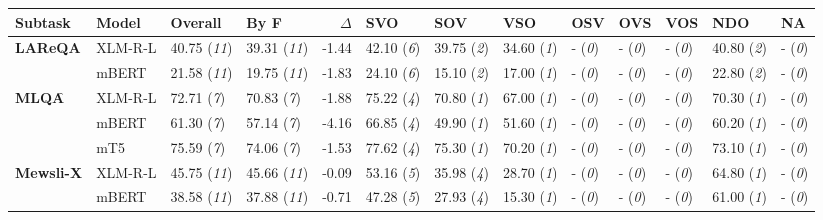 \begin{tabular}{ll||llr|llllllll}
	\toprule
	    Subtask                                    & Model & \textbf{Overall} & \textbf{By F} & $\Delta$ & SVO & SOV & VSO & OSV & OVS & VOS & NDO & NA \\\midrule\midrule
	\multirow{2}{*}{\textbf{LAReQA}\map} & XLM-R-L & 40.75 (\textit{11}) & 39.31 (\textit{11}) & -1.44 & \cellcolor{high-color!40}  42.10 (\textit{6}) &  39.75 (\textit{2}) & \cellcolor{low-color!40}  34.60 (\textit{1}) & - (\textit{0}) & - (\textit{0}) & - (\textit{0}) &  40.80 (\textit{2}) & - (\textit{0}) \\
	 & mBERT & 21.58 (\textit{11}) & 19.75 (\textit{11}) & -1.83 & \cellcolor{high-color!40}  24.10 (\textit{6}) &  15.10 (\textit{2}) & \cellcolor{low-color!40}  17.00 (\textit{1}) & - (\textit{0}) & - (\textit{0}) & - (\textit{0}) &  22.80 (\textit{2}) & - (\textit{0}) \\\midrule
	\multirow{3}{*}{\textbf{MLQA}\f} & XLM-R-L & 72.71 (\textit{7}) & 70.83 (\textit{7}) & -1.88 & \cellcolor{high-color!40}  75.22 (\textit{4}) & \cellcolor{low-color!40}  70.80 (\textit{1}) & \cellcolor{low-color!40}  67.00 (\textit{1}) & - (\textit{0}) & - (\textit{0}) & - (\textit{0}) & \cellcolor{low-color!40}  70.30 (\textit{1}) & - (\textit{0}) \\
	 & mBERT & 61.30 (\textit{7}) & 57.14 (\textit{7}) & -4.16 & \cellcolor{high-color!40}  66.85 (\textit{4}) & \cellcolor{low-color!40}  49.90 (\textit{1}) & \cellcolor{low-color!40}  51.60 (\textit{1}) & - (\textit{0}) & - (\textit{0}) & - (\textit{0}) & \cellcolor{low-color!40}  60.20 (\textit{1}) & - (\textit{0}) \\
	 & mT5 & 75.59 (\textit{7}) & 74.06 (\textit{7}) & -1.53 & \cellcolor{high-color!40}  77.62 (\textit{4}) & \cellcolor{low-color!40}  75.30 (\textit{1}) & \cellcolor{low-color!40}  70.20 (\textit{1}) & - (\textit{0}) & - (\textit{0}) & - (\textit{0}) & \cellcolor{low-color!40}  73.10 (\textit{1}) & - (\textit{0}) \\\midrule
	\multirow{2}{*}{\textbf{Mewsli-X}\map} & XLM-R-L & 45.75 (\textit{11}) & 45.66 (\textit{11}) & -0.09 & \cellcolor{high-color!40}  53.16 (\textit{5}) &  35.98 (\textit{4}) & \cellcolor{low-color!40}  28.70 (\textit{1}) & - (\textit{0}) & - (\textit{0}) & - (\textit{0}) & \cellcolor{low-color!40}  64.80 (\textit{1}) & - (\textit{0}) \\
	 & mBERT & 38.58 (\textit{11}) & 37.88 (\textit{11}) & -0.71 & \cellcolor{high-color!40}  47.28 (\textit{5}) &  27.93 (\textit{4}) & \cellcolor{low-color!40}  15.30 (\textit{1}) & - (\textit{0}) & - (\textit{0}) & - (\textit{0}) & \cellcolor{low-color!40}  61.00 (\textit{1}) & - (\textit{0}) \\\midrule

\end{tabular}
